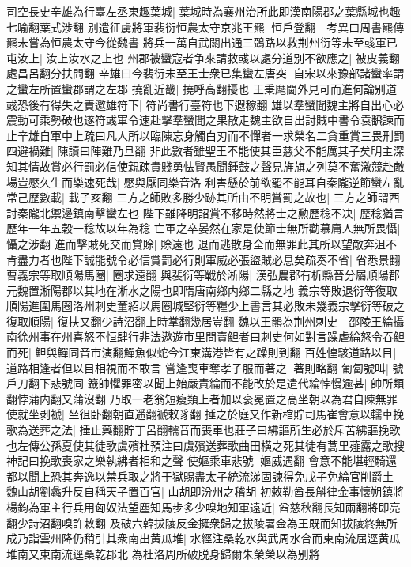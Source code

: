司空長史辛雄為行臺左丞東趣葉城|{
	葉城時為襄州治所此即漢南陽郡之葉縣城也趣七喻翻葉式涉翻}
别遣征虜將軍裴衍恒農太守京兆王羆|{
	恒戶登翻　考異曰周書羆傳羆未嘗為恒農太守今從魏書}
將兵一萬自武關出通三鵶路以救荆州衍等未至彧軍已屯汝上|{
	汝上汝水之上也}
州郡被蠻寇者争來請救彧以處分道别不欲應之|{
	被皮義翻處昌呂翻分扶問翻}
辛雄曰今裴衍未至王士衆已集蠻左唐突|{
	自宋以來豫部諸蠻率謂之蠻左所置蠻郡謂之左郡}
撓亂近畿|{
	撓呼高翻擾也}
王秉麾閫外見可而進何論别道彧恐後有得失之責邀雄符下|{
	符尚書行臺符也下遐稼翻}
雄以羣蠻聞魏主將自出心必震動可乘勢破也遂符彧軍令速赴擊羣蠻聞之果散走魏主欲自出討賊中書令袁飜諫而止辛雄自軍中上疏曰凡人所以臨陳忘身觸白刃而不憚者一求榮名二貪重賞三畏刑罰四避禍難|{
	陳讀曰陣難乃旦翻}
非此數者雖聖王不能使其臣慈父不能厲其子矣明主深知其情故賞必行罰必信使親疎貴賤勇怯賢愚聞鍾鼓之聲見旌旗之列莫不奮激競赴敵場豈懕久生而樂速死哉|{
	懕與厭同樂音洛}
利害懸於前欲罷不能耳自秦隴逆節蠻左亂常己歷數載|{
	載子亥翻}
三方之師敗多勝少跡其所由不明賞罰之故也|{
	三方之師謂西討秦隴北禦邊鎮南擊蠻左也}
陛下雖降明詔賞不移時然將士之勲歷稔不决|{
	歷稔猶言歷年一年五穀一稔故以年為稔}
亡軍之卒晏然在家是使節士無所勸慕庸人無所畏懾|{
	懾之涉翻}
進而擊賊死交而賞賒|{
	賒遠也}
退而逃散身全而無罪此其所以望敵奔沮不肯盡力者也陛下誠能號令必信賞罰必行則軍威必張盜賊必息矣疏奏不省|{
	省悉景翻}
曹義宗等取順陽馬圈|{
	圈求遠翻}
與裴衍等戰於淅陽|{
	漢弘農郡有析縣晉分屬順陽郡元魏置淅陽郡以其地在淅水之陽也即隋唐南鄉内鄉二縣之地}
義宗等敗退衍等復取順陽進圍馬圈洛州刺史董紹以馬圈城堅衍等糧少上書言其必敗未幾義宗擊衍等破之復取順陽|{
	復扶又翻少詩沼翻上時掌翻幾居豈翻}
魏以王羆為荆州刺史　邵陵王綸攝南徐州事在州喜怒不恒肆行非法遨遊市里問賣䱇者曰刺史何如對言躁虐綸怒令吞䱇而死|{
	䱇與鱓同音市演翻鱓魚似蛇今江東溝港皆有之躁則到翻}
百姓惶駭道路以目|{
	道路相逢者但以目相視而不敢言}
嘗逢喪車奪孝子服而著之|{
	著則略翻}
匍匐號叫|{
	號戶刀翻下悲號同}
籖帥懼罪密以聞上始嚴責綸而不能改於是遣代綸悖慢逾甚|{
	帥所類翻悖蒲内翻又蒲沒翻}
乃取一老翁短瘦類上者加以衮冕置之高坐朝以為君自陳無罪使就坐剥褫|{
	坐徂卧翻朝直遥翻禠敕豸翻}
捶之於庭又作新棺貯司馬崔會意以轜車挽歌為送葬之法|{
	捶止藥翻貯丁呂翻轜音而喪車也莊子曰紼謳所生必於斥苦紼謳挽歌也左傳公孫夏使其徒歌虞殯杜預注曰虞殯送葬歌曲田横之死其徒有蒿里薤露之歌搜神記曰挽歌喪家之樂執紼者相和之聲}
使嫗乘車悲號|{
	嫗威遇翻}
會意不能堪輕騎還都以聞上恐其奔逸以禁兵取之將于獄賜盡太子統流涕固諫得免戊子免綸官削爵土　魏山胡劉蠡升反自稱天子置百官|{
	山胡即汾州之稽胡}
初敕勒酋長斛律金事懷朔鎮將楊鈞為軍主行兵用匈奴法望塵知馬步多少嗅地知軍遠近|{
	酋慈秋翻長知兩翻將即亮翻少詩沼翻嗅許敕翻}
及破六韓拔陵反金擁衆歸之拔陵署金為王既而知拔陵終無所成乃詣雲州降仍稍引其衆南出黄瓜堆|{
	水經注桑乾水與武周水合而東南流屈逕黄瓜堆南又東南流逕桑乾郡北}
為杜洛周所破脱身歸爾朱榮榮以為别將

